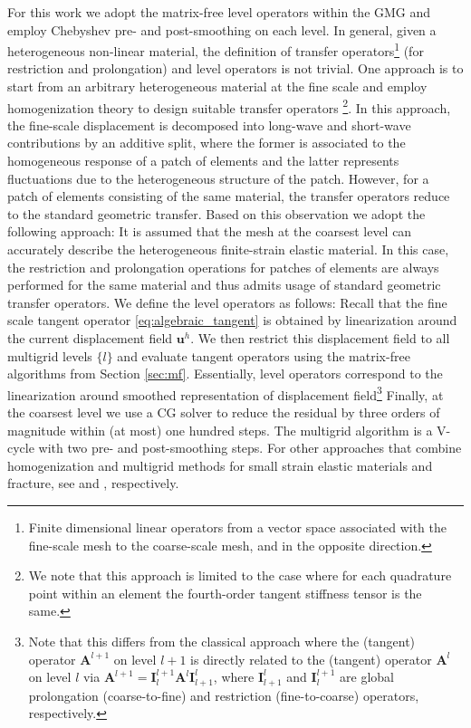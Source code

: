 \documentclass[times,doublespace]{nmeauth}
\def\gz  #1{           \mbox{$\boldsymbol{#1}$}}
\begin{document}
For this work we adopt the matrix-free level operators within the GMG and employ Chebyshev pre- and post-smoothing on each level. In general, given a heterogeneous non-linear material, the definition of transfer operators\footnote{{\color{red}Finite dimensional linear operators from a vector space associated with the fine-scale mesh to the coarse-scale mesh, and in the opposite direction.}} (for restriction and prolongation) and level operators is not trivial. One approach is to start from an arbitrary heterogeneous material at the fine scale and employ homogenization theory \cite{Suquet1987, Hill1972,Hashin1983,Castaneda1997} to design suitable transfer operators \cite{Miehe2007}\footnote{
  We note that this approach is limited to the case where for each quadrature point within an element the fourth-order tangent {\color{red}stiffness tensor} is the same.
}.
In this approach, the fine-scale displacement is decomposed into long-wave and short-wave contributions by an additive split, where the former is associated to the homogeneous response of a patch of elements and the latter represents fluctuations due to the heterogeneous structure of the patch.
However, for a patch of elements consisting of the same material, the transfer operators reduce to the standard geometric transfer.
Based on this observation we adopt the following approach: It is assumed that the mesh at the coarsest level can accurately describe the heterogeneous finite-strain elastic material.
In this case, the restriction and prolongation operations for patches of elements are always performed for the same material and thus admits usage of standard geometric transfer operators.
We define the level operators as follows: Recall that the fine scale tangent {\color{red}operator} \eqref{eq:algebraic_tangent} is obtained by linearization around the current displacement field $\gz u^h$. We then restrict this displacement field to all multigrid levels $\{l\}$ and evaluate tangent operators using the matrix-free algorithms from Section \ref{sec:mf}.
Essentially, level operators correspond to the linearization around smoothed representation of displacement field\footnote{
Note that this differs from the classical approach where the (tangent) operator $\gz A^{l+1}$ on level $l+1$ is directly related to the (tangent) operator $\gz A^{l}$ on level $l$ via $\gz A^{l+1}=\gz I^{l+1}_{l} \gz A^l \gz I^l_{l+1}$, where $\gz I^l_{l+1}$ and $\gz I^{l+1}_l$ are global prolongation (coarse-to-fine) and restriction (fine-to-coarse) operators, respectively.
}
Finally, at the coarsest level we use a CG solver to reduce the residual by three orders of magnitude within (at most) one hundred steps.
The multigrid algorithm is a V-cycle with two pre- and post-smoothing steps. For other approaches that combine homogenization and multigrid methods for small strain elastic materials {\color{red}and fracture}, see \cite{Bayreuther2003,Fish1995} {\color{red}and \cite{Kaczmarczyk2010}, respectively}.
\end{document}
